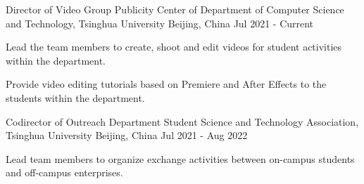 

\begin{cventries}

  \cventry
    {Director of Video Group} %
    {Publicity Center of Department of Computer Science and Technology, Tsinghua University} %
    {Beijing, China} %
    {Jul 2021 - Current} %
    {
      \begin{cvitems} %
        \item {Lead the team members to create, shoot and edit videos for student activities within the department.}
        \item {Provide video editing tutorials based on Premiere and After Effects to the students within the department.}
      \end{cvitems}
    }

  \cventry
    {Codirector of Outreach Department} %
    {Student Science and Technology Association, Tsinghua University} %
    {Beijing, China} %
    {Jul 2021 - Aug 2022} %
    {
      \begin{cvitems} %
        \item {Lead team members to organize exchange activities between on-campus students and off-campus enterprises.}
      \end{cvitems}
    }

\end{cventries}
